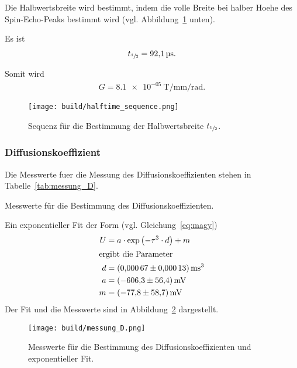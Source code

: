 Die Halbwertsbreite wird bestimmt, indem die volle Breite bei halber Hoehe des Spin-Echo-Peaks bestimmt wird (vgl. Abbildung~\ref{fig:halftime_sequence} unten).

Es ist
\begin{align}%
  \label{eq:t_1/2}
  t_{\sfrac{1}{2}} = \SI{92.1}{\micro\second}.
\end{align}

Somit wird
\begin{align}%
  \label{eq:g}
  G = \SI[]{8.1e-05}{\tesla\per\milli\meter\per\radian}.
\end{align}



\begin{figure}[ht]
  \centering
  \texttt{[image: build/halftime\_sequence.png]}
  \caption{Sequenz für die Bestimmung der Halbwertsbreite $t_{\sfrac{1}{2}}$.}%
  \label{fig:halftime_sequence}
\end{figure}


\subsubsection{Diffusionskoeffizient}%
\label{sub:diffusionskoeefizient}
Die Messwerte fuer die Messung des Diffusionskoeffizienten stehen in Tabelle~\ref{tab:messung_D}.

\begin{table}[ht]
  \centering
  \caption{Messwerte für die Bestimmung des Diffusionskoeffizienten.}%
  \label{tab:messung_D}
  
\end{table}

Ein exponentieller Fit der Form (vgl. Gleichung~\eqref{eq:magy})
\begin{align*}
  U &= a \cdot \exp{\left(- \tau^3 \cdot d\right)} + m \\
  \intertext{ergibt die Parameter}
  d &= \SI{0.00067 \pm 0.00013}{\milli\second\tothe3} \\
  a &= \SI{-606.3 \pm 56.4}{\milli\volt} \\
  m &= \SI{-77.8 \pm 58.7}{\milli\volt}
\end{align*}
Der Fit und die Messwerte sind in Abbildung~\ref{fig:messung_D} dargestellt.

\begin{figure}[ht]
  \centering
  \texttt{[image: build/messung\_D.png]}
  \caption{Messwerte für die Bestimmung des Diffusionskoeffizienten und exponentieller Fit.}%
  \label{fig:messung_D}
\end{figure}

